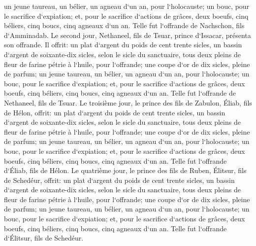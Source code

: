 \verse un jeune taureau, un bélier, un agneau d`un an, pour l`holocauste; 
\verse un bouc, pour le sacrifice d`expiation; 
\verse et, pour le sacrifice d`actions de grâces, deux boeufs, cinq béliers, cinq boucs, cinq agneaux d`un an. Telle fut l`offrande de Nachschon, fils d`Amminadab. 
\verse Le second jour, Nethaneel, fils de Tsuar, prince d`Issacar, présenta son offrande. 
\verse Il offrit: un plat d`argent du poids de cent trente sicles, un bassin d`argent de soixante-dix sicles, selon le sicle du sanctuaire, tous deux pleins de fleur de farine pétrie à l`huile, pour l`offrande; 
\verse une coupe d`or de dix sicles, pleine de parfum; 
\verse un jeune taureau, un bélier, un agneau d`un an, pour l`holocauste; 
\verse un bouc, pour le sacrifice d`expiation; 
\verse et, pour le sacrifice d`actions de grâces, deux boeufs, cinq béliers, cinq boucs, cinq agneaux d`un an. Telle fut l`offrande de Nethaneel, fils de Tsuar. 
\verse Le troisième jour, le prince des fils de Zabulon, Éliab, fils de Hélon, 
\verse offrit: un plat d`argent du poids de cent trente sicles, un bassin d`argent de soixante-dix sicles, selon le sicle du sanctuaire, tous deux pleins de fleur de farine pétrie à l`huile, pour l`offrande; 
\verse une coupe d`or de dix sicles, pleine de parfum; 
\verse un jeune taureau, un bélier, un agneau d`un an, pour l`holocauste; 
\verse un bouc, pour le sacrifice d`expiation; 
\verse et, pour le sacrifice d`actions de grâces, deux boeufs, cinq béliers, cinq boucs, cinq agneaux d`un an. Telle fut l`offrande d`Éliab, fils de Hélon. 
\verse Le quatrième jour, le prince des fils de Ruben, Élitsur, fils de Schedéur, 
\verse offrit: un plat d`argent du poids de cent trente sicles, un bassin d`argent de soixante-dix sicles, selon le sicle du sanctuaire, tous deux pleins de fleur de farine pétrie à l`huile, pour l`offrande; 
\verse une coupe d`or de dix sicles, pleine de parfum; 
\verse un jeune taureau, un bélier, un agneau d`un an, pour l`holocauste; 
\verse un bouc, pour le sacrifice d`expiation; 
\verse et, pour le sacrifice d`actions de grâces, deux boeufs, cinq béliers, cinq boucs, cinq agneaux d`un an. Telle fut l`offrande d`Élitsur, fils de Schedéur. 
